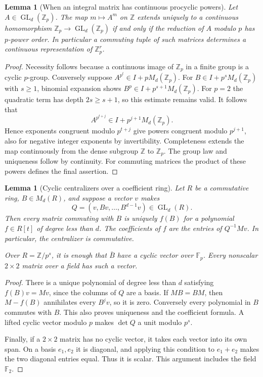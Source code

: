 \documentclass[11pt]{article}
\newtheorem{lemma}[theorem]{Lemma}
\theoremstyle{definition}
\theoremstyle{remark}
\begin{document}
\begin{lemma}[When an integral matrix has continuous procyclic powers]\label{lem:procyclic-powers}
Let $A\in\operatorname{GL}_d(\mathbb Z_p)$. The map $m\mapsto A^m$ on $\mathbb Z$ extends uniquely to a continuous homomorphism $\mathbb Z_p\to\operatorname{GL}_d(\mathbb Z_p)$ if and only if the reduction of $A$ modulo $p$ has $p$-power order. In particular a commuting tuple of such matrices determines a continuous representation of $\mathbb Z_p^r$.
\end{lemma}
\begin{proof}
Necessity follows because a continuous image of $\mathbb Z_p$ in a finite group is a cyclic $p$-group. Conversely suppose $A^{p^t}\in I+pM_d(\mathbb Z_p)$. For $B\in I+p^sM_d(\mathbb Z_p)$ with $s\geq1$, binomial expansion shows $B^p\in I+p^{s+1}M_d(\mathbb Z_p)$. For $p=2$ the quadratic term has depth $2s\geq s+1$, so this estimate remains valid. It follows that
\[
 A^{p^{t+j}}\in I+p^{j+1}M_d(\mathbb Z_p).
\]
Hence exponents congruent modulo $p^{t+j}$ give powers congruent modulo $p^{j+1}$, also for negative integer exponents by invertibility. Completeness extends the map continuously from the dense subgroup $\mathbb Z$ to $\mathbb Z_p$. The group law and uniqueness follow by continuity. For commuting matrices the product of these powers defines the final assertion.
\end{proof}

\begin{lemma}[Cyclic centralizers over a coefficient ring]\label{lem:cyclic-centralizer}
Let $R$ be a commutative ring, $B\in M_d(R)$, and suppose a vector $v$ makes
\[
 Q=(v,Bv,\ldots,B^{d-1}v)\in\operatorname{GL}_d(R).
\]
Then every matrix commuting with $B$ is uniquely $f(B)$ for a polynomial $f\in R[t]$ of degree less than $d$. The coefficients of $f$ are the entries of $Q^{-1}Mv$. In particular, the centralizer is commutative.

Over $R=\mathbb Z/p^s$, it is enough that $\bar B$ have a cyclic vector over $\mathbb F_p$. Every nonscalar $2\times2$ matrix over a field has such a vector.
\end{lemma}
\begin{proof}
There is a unique polynomial of degree less than $d$ satisfying $f(B)v=Mv$, since the columns of $Q$ are a basis. If $MB=BM$, then $M-f(B)$ annihilates every $B^jv$, so it is zero. Conversely every polynomial in $B$ commutes with $B$. This also proves uniqueness and the coefficient formula. A lifted cyclic vector modulo $p$ makes $\det Q$ a unit modulo $p^s$.

Finally, if a $2\times2$ matrix has no cyclic vector, it takes each vector into its own span. On a basis $e_1,e_2$ it is diagonal, and applying this condition to $e_1+e_2$ makes the two diagonal entries equal. Thus it is scalar. This argument includes the field $\mathbb F_2$.
\end{proof}
\end{document}
